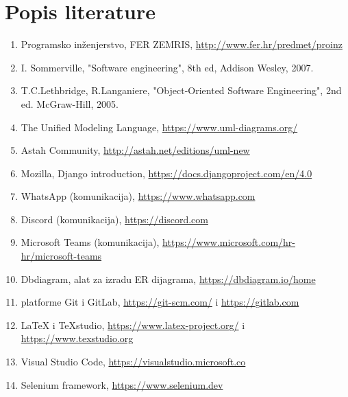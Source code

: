 \chapter*{Popis literature}
	 	
 		
	
		
		\begin{enumerate}
			
			
			\item  Programsko inženjerstvo, FER ZEMRIS, \url{http://www.fer.hr/predmet/proinz}
			
			\item  I. Sommerville, "Software engineering", 8th ed, Addison Wesley, 2007.
			
			\item  T.C.Lethbridge, R.Langaniere, "Object-Oriented Software Engineering", 2nd ed. McGraw-Hill, 2005.
			
			\item  The Unified Modeling Language, \url{https://www.uml-diagrams.org/}
			
			\item  Astah Community, \url{http://astah.net/editions/uml-new}
			
			\item  Mozilla, Django introduction, \url{https://docs.djangoproject.com/en/4.0}

			\item WhatsApp (komunikacija), \url{https://www.whatsapp.com}

			\item Discord (komunikacija), \url{https://discord.com}

			\item Microsoft Teams (komunikacija), \url{https://www.microsoft.com/hr-hr/microsoft-teams}

			\item Dbdiagram, alat za izradu ER dijagrama, \url{https://dbdiagram.io/home}

			\item platforme Git i GitLab, \url{https://git-scm.com/} i \url{https://gitlab.com}

			\item LaTeX i TeXstudio, \url{https://www.latex-project.org/} i \url{https://www.texstudio.org}

			\item Visual Studio Code, \url{https://visualstudio.microsoft.co}

			\item Selenium framework, \url{https://www.selenium.dev}		
			
		\end{enumerate}
